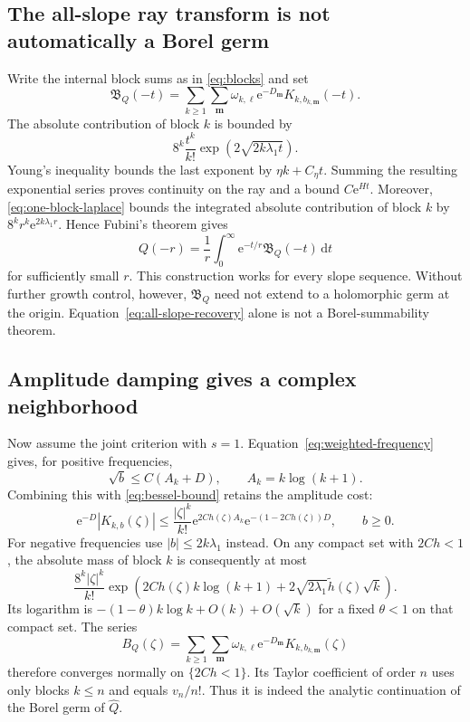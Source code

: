\documentclass[11pt,a4paper]{article}
\numberwithin{equation}{section}
\theoremstyle{definition}
\theoremstyle{remark}
\theoremstyle{definition}
\newcommand{\Q}{\widehat Q}
\newcommand{\e}{\mathrm e}
\newcommand{\dd}{\mathrm d}
\begin{document}
\subsection{The all-slope ray transform is not automatically a Borel germ}
Write the internal block sums as in \eqref{eq:blocks} and set
\begin{equation}
 \mathfrak B_Q(-t)=\sum_{k\ge1}\sum_{\mathbf m}
       \omega_{k,\ell}\e^{-D_{\mathbf m}}
                         K_{k,b_{k,\mathbf m}}(-t).
 \label{eq:ray-transform}
\end{equation}
The absolute contribution of block $k$ is bounded by
\[
 8^k\frac{t^k}{k!}\exp(2\sqrt{2k\lambda_1t}).
\]
Young's inequality bounds the last exponent by $\eta k+C_\eta t$.
Summing the resulting exponential series proves continuity on the ray
and a bound $C\e^{Ht}$. Moreover,
\eqref{eq:one-block-laplace} bounds the integrated absolute contribution
of block $k$ by $8^kr^k\e^{2k\lambda_1r}$. Hence Fubini's theorem gives
\begin{equation}
 Q(-r)=\frac1r\int_0^\infty
                    \e^{-t/r}\mathfrak B_Q(-t)\,\dd t
 \label{eq:all-slope-recovery}
\end{equation}
for sufficiently small $r$.
This construction works for every slope sequence. Without further growth
control, however, $\mathfrak B_Q$ need not extend to a holomorphic germ
at the origin. Equation~\eqref{eq:all-slope-recovery} alone is not a
Borel-summability theorem.

\subsection{Amplitude damping gives a complex neighborhood}
Now assume the joint criterion with $s=1$.
Equation~\eqref{eq:weighted-frequency} gives, for positive frequencies,
\[
 \sqrt b\le C(A_k+D),\qquad A_k=k\log(k+1).
\]
Combining this with \eqref{eq:bessel-bound} retains the amplitude cost:
\begin{equation}
 \e^{-D}|K_{k,b}(\zeta)|
 \le\frac{|\zeta|^k}{k!}
    \e^{2Ch(\zeta)A_k}\e^{-(1-2Ch(\zeta))D},\qquad b\ge0.
 \label{eq:cost-borel}
\end{equation}
For negative frequencies use $|b|\le2k\lambda_1$ instead. On any compact
set with $2Ch<1$, the absolute mass of block $k$ is consequently at most
\begin{equation}
 \frac{8^k|\zeta|^k}{k!}
 \exp\left(2Ch(\zeta)k\log(k+1)
                 +2\sqrt{2\lambda_1}\widetilde h(\zeta)\sqrt k\right).
 \label{eq:general-borel-majorant}
\end{equation}
Its logarithm is $-(1-\theta)k\log k+O(k)+O(\sqrt k)$ for a fixed
$\theta<1$ on that compact set. The series
\begin{equation}
 B_Q(\zeta)=\sum_{k\ge1}\sum_{\mathbf m}
       \omega_{k,\ell}\e^{-D_{\mathbf m}}
                            K_{k,b_{k,\mathbf m}}(\zeta)
 \label{eq:borel-series}
\end{equation}
therefore converges normally on $\{2Ch<1\}$. Its Taylor coefficient of
order $n$ uses only blocks $k\le n$ and equals $v_n/n!$. Thus it is
indeed the analytic continuation of the Borel germ of $\Q$.
\end{document}
